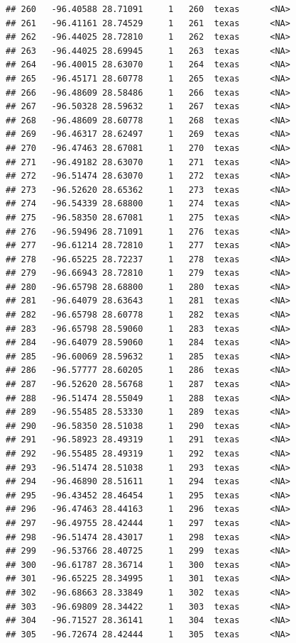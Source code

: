 \documentclass[
]{article}
\begin{document}
\begin{verbatim}
## 260   -96.40588 28.71091     1   260  texas      <NA>
## 261   -96.41161 28.74529     1   261  texas      <NA>
## 262   -96.44025 28.72810     1   262  texas      <NA>
## 263   -96.44025 28.69945     1   263  texas      <NA>
## 264   -96.40015 28.63070     1   264  texas      <NA>
## 265   -96.45171 28.60778     1   265  texas      <NA>
## 266   -96.48609 28.58486     1   266  texas      <NA>
## 267   -96.50328 28.59632     1   267  texas      <NA>
## 268   -96.48609 28.60778     1   268  texas      <NA>
## 269   -96.46317 28.62497     1   269  texas      <NA>
## 270   -96.47463 28.67081     1   270  texas      <NA>
## 271   -96.49182 28.63070     1   271  texas      <NA>
## 272   -96.51474 28.63070     1   272  texas      <NA>
## 273   -96.52620 28.65362     1   273  texas      <NA>
## 274   -96.54339 28.68800     1   274  texas      <NA>
## 275   -96.58350 28.67081     1   275  texas      <NA>
## 276   -96.59496 28.71091     1   276  texas      <NA>
## 277   -96.61214 28.72810     1   277  texas      <NA>
## 278   -96.65225 28.72237     1   278  texas      <NA>
## 279   -96.66943 28.72810     1   279  texas      <NA>
## 280   -96.65798 28.68800     1   280  texas      <NA>
## 281   -96.64079 28.63643     1   281  texas      <NA>
## 282   -96.65798 28.60778     1   282  texas      <NA>
## 283   -96.65798 28.59060     1   283  texas      <NA>
## 284   -96.64079 28.59060     1   284  texas      <NA>
## 285   -96.60069 28.59632     1   285  texas      <NA>
## 286   -96.57777 28.60205     1   286  texas      <NA>
## 287   -96.52620 28.56768     1   287  texas      <NA>
## 288   -96.51474 28.55049     1   288  texas      <NA>
## 289   -96.55485 28.53330     1   289  texas      <NA>
## 290   -96.58350 28.51038     1   290  texas      <NA>
## 291   -96.58923 28.49319     1   291  texas      <NA>
## 292   -96.55485 28.49319     1   292  texas      <NA>
## 293   -96.51474 28.51038     1   293  texas      <NA>
## 294   -96.46890 28.51611     1   294  texas      <NA>
## 295   -96.43452 28.46454     1   295  texas      <NA>
## 296   -96.47463 28.44163     1   296  texas      <NA>
## 297   -96.49755 28.42444     1   297  texas      <NA>
## 298   -96.51474 28.43017     1   298  texas      <NA>
## 299   -96.53766 28.40725     1   299  texas      <NA>
## 300   -96.61787 28.36714     1   300  texas      <NA>
## 301   -96.65225 28.34995     1   301  texas      <NA>
## 302   -96.68663 28.33849     1   302  texas      <NA>
## 303   -96.69809 28.34422     1   303  texas      <NA>
## 304   -96.71527 28.36141     1   304  texas      <NA>
## 305   -96.72674 28.42444     1   305  texas      <NA>

\end{verbatim}
\end{document}
